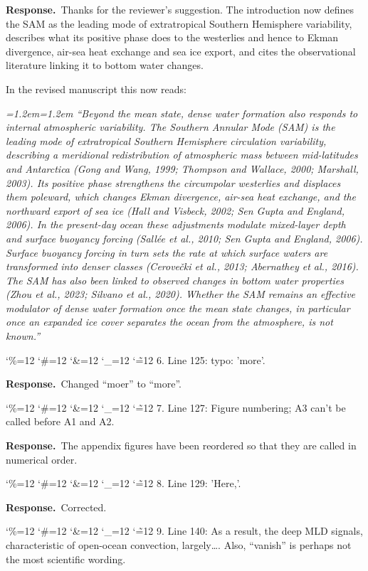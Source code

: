 \documentclass[11pt,a4paper]{article}
\newcommand{\comment}[1]{\par\medskip\noindent\color{black}\begingroup\catcode`\%=12 \catcode`\#=12 \catcode`\&=12 \catcode`\_=12 \catcode`\~=12 \commentbody}
\newcommand{\commentbody}[1]{#1\endgroup\par\smallskip}
\newcommand{\response}{\par\noindent\color{chgcol}\textbf{Response.}\ }
\newenvironment{change}{\par\smallskip\color{chgcol}\small\itshape\leftskip=1.2em\rightskip=1.2em\noindent\ignorespaces}{\par\smallskip}
\begin{document}
\response Thanks for the reviewer’s suggestion. The introduction now defines the SAM as the leading mode of extratropical Southern Hemisphere variability, describes what its positive phase does to the westerlies and hence to Ekman divergence, air-sea heat exchange and sea ice export, and cites the observational literature linking it to bottom water changes.

In the revised manuscript this now reads:

\begin{change}
``Beyond the mean state, dense water formation also responds to internal atmospheric variability. The Southern Annular Mode (SAM) is the leading mode of extratropical Southern Hemisphere circulation variability, describing a meridional redistribution of atmospheric mass between mid-latitudes and Antarctica (Gong and Wang, 1999; Thompson and Wallace, 2000; Marshall, 2003). Its positive phase strengthens the circumpolar westerlies and displaces them poleward, which changes Ekman divergence, air-sea heat exchange, and the northward export of sea ice (Hall and Visbeck, 2002; Sen Gupta and England, 2006). In the present-day ocean these adjustments modulate mixed-layer depth and surface buoyancy forcing (Sallée et al., 2010; Sen Gupta and England, 2006). Surface buoyancy forcing in turn sets the rate at which surface waters are transformed into denser classes (Cerovečki et al., 2013; Abernathey et al., 2016). The SAM has also been linked to observed changes in bottom water properties (Zhou et al., 2023; Silvano et al., 2020). Whether the SAM remains an effective modulator of dense water formation once the mean state changes, in particular once an expanded ice cover separates the ocean from the atmosphere, is not known.''
\end{change}

\comment{R1}{6. Line 125: typo: 'more'.}

\response Changed ``moer'' to ``more''.

\comment{R1}{7. Line 127: Figure numbering; A3 can't be called before A1 and A2.}

\response The appendix figures have been reordered so that they are called in numerical order.

\comment{R1}{8. Line 129: 'Here,'.}

\response Corrected.

\comment{R1}{9. Line 140: As a result, the deep MLD signals, characteristic of open-ocean convection, largely…. Also, ``vanish'' is perhaps not the most scientific wording.}
\end{document}
